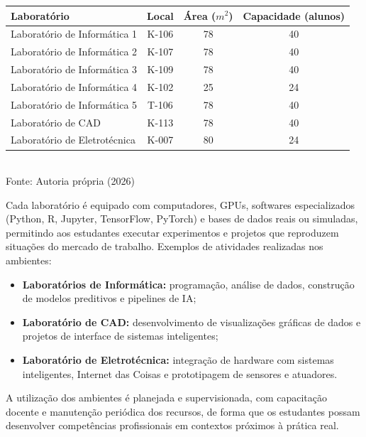 \begin{quadro}[htb]
    \centering
    \caption{Ambientes de ensino e aprendizagem}
    \label{quadro:4.1}
    \vspace{0.2cm}
    \begin{tabular}{|l|c|c|c|}
        \hline
        \textbf{Laboratório} & \textbf{Local} & \textbf{Área ($m^2$)} & \textbf{Capacidade (alunos)} \\ \hline
        Laboratório de Informática 1 & K-106 & 78 & 40 \\ \hline
        Laboratório de Informática 2 & K-107 & 78 & 40 \\ \hline
        Laboratório de Informática 3 & K-109 & 78 & 40 \\ \hline
        Laboratório de Informática 4 & K-102 & 25 & 24 \\ \hline
        Laboratório de Informática 5 & T-106 & 78 & 40 \\ \hline
        Laboratório de CAD & K-113 & 78 & 40 \\ \hline
        Laboratório de Eletrotécnica & K-007 & 80 & 24 \\ \hline
    \end{tabular}
    \small \\ Fonte: Autoria própria (2026)
\end{quadro}

Cada laboratório é equipado com computadores, GPUs, softwares especializados (Python, R, Jupyter, TensorFlow, PyTorch) e bases de dados reais ou simuladas, permitindo aos estudantes executar experimentos e projetos que reproduzem situações do mercado de trabalho. Exemplos de atividades realizadas nos ambientes:
\begin{itemize}
    \item \textbf{Laboratórios de Informática:} programação, análise de dados, construção de modelos preditivos e pipelines de IA;
    \item \textbf{Laboratório de CAD:} desenvolvimento de visualizações gráficas de dados e projetos de interface de sistemas inteligentes;
    \item \textbf{Laboratório de Eletrotécnica:} integração de hardware com sistemas inteligentes, Internet das Coisas e prototipagem de sensores e atuadores.
\end{itemize}

A utilização dos ambientes é planejada e supervisionada, com capacitação docente e manutenção periódica dos recursos, de forma que os estudantes possam desenvolver competências profissionais em contextos próximos à prática real.

